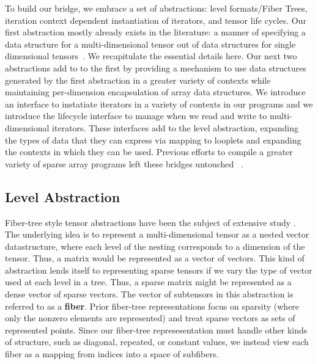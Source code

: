 To build our bridge, we embrace a set of abstractions: level formats/Fiber Trees, iteration context dependent instantiation of iterators, and tensor life cycles.
%
Our first abstraction mostly already exists in the literature: a manner of specifying a data structure for a multi-dimensional tensor out of data structures for single dimensional tensors~\cite{sze2017efficient,chou2022compilation, chou2018format}.
%
We recapitulate the essential details here.
%
Our next two abstractions add to to the first by providing a mechanism to use data structures generated by the first abstraction in a greater variety of contexts while maintaining per-dimension encapsulation of array data structures.
%
We introduce an interface to instatiate iterators in a variety of contexts in our programs and we introduce the lifecycle interface to manage when we read and write to multi-dimensional iterators.
%
These interfaces add to the level abstraction, expanding the types of data that they can express via mapping to looplets and expanding the contexts in which they can be used.
%
Previous efforts to compile a greater variety of sparse array programs left these bridges untouched ~\cite{henry_compilation_2021, won2023unified, senanayake2020sparse}.


\subsection{Level Abstraction}

Fiber-tree style tensor abstractions have been the subject of extensive study
\cite{sze2017efficient, chou2022compilation, chou2018format}.  The underlying
idea is to represent a multi-dimensional tensor as a nested vector
datastructure, where each level of the nesting corresponds to a dimension of the
tensor. Thus, a matrix would be represented as a vector of vectors. This kind of
abstraction lends itself to representing sparse tensors if we vary the type of
vector used at each level in a tree. Thus, a sparse matrix might be represented
as a dense vector of sparse vectors. The vector of subtensors in this
abstraction is referred to as a \textbf{fiber}. Prior fiber-tree representations
focus on sparsity (where only the nonzero elements are represented) and treat
sparse vectors as sets of represented points. Since our fiber-tree
represesentation must handle other kinds of structure, such as diagonal,
repeated, or constant values, we instead view each fiber as a mapping from
indices into a space of subfibers.

